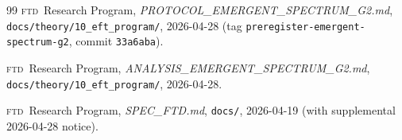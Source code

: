 \documentclass[11pt,reqno]{amsart}
\theoremstyle{plain}
\theoremstyle{definition}
\theoremstyle{remark}
\numberwithin{equation}{section}
\newcommand{\FTD}{\textsc{ftd}}
\begin{document}
\begin{thebibliography}{99}
\FTD\ Research Program, \emph{PROTOCOL\_EMERGENT\_SPECTRUM\_G2.md},
\texttt{docs/theory/10\_eft\_program/}, 2026-04-28
(tag \texttt{preregister-emergent-spectrum-g2}, commit
\texttt{33a6aba}).

\FTD\ Research Program, \emph{ANALYSIS\_EMERGENT\_SPECTRUM\_G2.md},
\texttt{docs/theory/10\_eft\_program/}, 2026-04-28.

\FTD\ Research Program, \emph{SPEC\_FTD.md},
\texttt{docs/}, 2026-04-19 (with supplemental 2026-04-28 notice).

\end{thebibliography}
\end{document}
